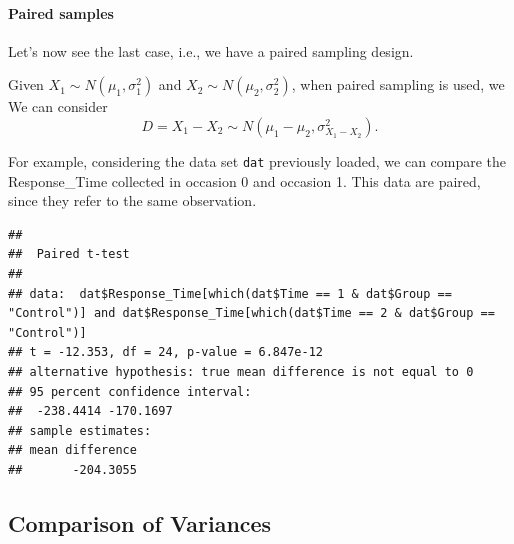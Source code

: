 \documentclass[
]{article}
\newenvironment{Shaded}{\begin{snugshade}}{\end{snugshade}}
\newcommand{\AttributeTok}[1]{\textcolor[rgb]{0.13,0.29,0.53}{#1}}
\newcommand{\ConstantTok}[1]{\textcolor[rgb]{0.56,0.35,0.01}{#1}}
\newcommand{\DecValTok}[1]{\textcolor[rgb]{0.00,0.00,0.81}{#1}}
\newcommand{\FloatTok}[1]{\textcolor[rgb]{0.00,0.00,0.81}{#1}}
\newcommand{\FunctionTok}[1]{\textcolor[rgb]{0.13,0.29,0.53}{\textbf{#1}}}
\newcommand{\NormalTok}[1]{#1}
\newcommand{\SpecialCharTok}[1]{\textcolor[rgb]{0.81,0.36,0.00}{\textbf{#1}}}
\newcommand{\StringTok}[1]{\textcolor[rgb]{0.31,0.60,0.02}{#1}}
\begin{document}
\hypertarget{paired-samples}{%
\paragraph{Paired samples}\label{paired-samples}}

Let's now see the last case, i.e., we have a paired sampling design.

Given \(X_1 \sim N(\mu_1,\sigma^2_1)\) and
\(X_2\sim N(\mu_2,\sigma^2_2)\), when paired sampling is used, we We can
consider \[D = X_1- X_2 \sim N(\mu_1- \mu_2,\sigma^2_{X_1 -X_2}).\]

For example, considering the data set \texttt{dat} previously loaded, we
can compare the Response\_Time collected in occasion 0 and occasion 1.
This data are paired, since they refer to the same observation.

\begin{Shaded}
\end{Shaded}

\begin{verbatim}
## 
##  Paired t-test
## 
## data:  dat$Response_Time[which(dat$Time == 1 & dat$Group == "Control")] and dat$Response_Time[which(dat$Time == 2 & dat$Group == "Control")]
## t = -12.353, df = 24, p-value = 6.847e-12
## alternative hypothesis: true mean difference is not equal to 0
## 95 percent confidence interval:
##  -238.4414 -170.1697
## sample estimates:
## mean difference 
##       -204.3055
\end{verbatim}

\hypertarget{comparison-of-variances}{%
\subsection{Comparison of Variances}\label{comparison-of-variances}}
\end{document}
